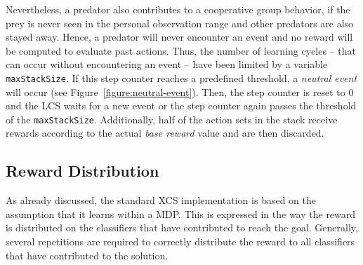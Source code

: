 Nevertheless, a predator also contributes to a cooperative group behavior, if the prey is never seen in the personal observation range and other predators are also stayed away. Hence, a predator will never encounter an event and no reward will be computed to evaluate past actions. Thus, the number of learning cycles -- that can occur without encountering an event -- have been limited by a variable \verb|maxStackSize|. If this step counter reaches a predefined threshold, a \emph{neutral event} will occur (see Figure~\ref{figure:neutral-event}). Then, the step counter is reset to $0$ and the LCS waits for a new event or the step counter again passes the threshold of the \verb|maxStackSize|. Additionally, half of the action sets in the stack receive rewards according to the actual \emph{base reward} value and are then discarded.


\subsection{Reward Distribution}
\label{subsection:reward-distribution}

As already discussed, the standard XCS implementation is based on the assumption that it learns within a MDP. This is expressed in the way the reward is distributed on the classifiers that have contributed to reach the goal. Generally, several repetitions are required to correctly distribute the reward to all classifiers that have contributed to the solution.

